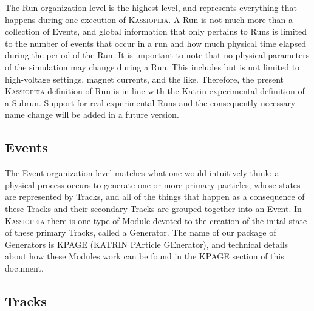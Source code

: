 The Run organization level is the highest level, and represents everything that happens during one execution of \textsc{Kassiopeia}.  A Run is not much more than a collection of Events, and global information that only pertains to Runs is limited to the number of events that occur in a run and how much physical time elapsed during the period of the Run.  It is important to note that no physical parameters of the simulation may change during a Run.  This includes but is not limited to high-voltage settings, magnet currents, and the like.  Therefore, the present \textsc{Kassiopeia} definition of Run is in line with the Katrin experimental definition of a Subrun.  Support for real experimental Runs and the consequently necessary name change will be added in a future version.

\subsection{Events}
\label{arch:events}

The Event organization level matches what one would intuitively think: a physical process occurs to generate one or more primary particles, whose states are represented by Tracks, and all of the things that happen as a consequence of these Tracks and their secondary Tracks are grouped together into an Event.  In \textsc{Kassiopeia} there is one type of Module devoted to the creation of the inital state of these primary Tracks, called a Generator.  The name of our package of Generators is KPAGE (KATRIN PArticle GEnerator), and technical details about how these Modules work can be found in the KPAGE section of this document.

\subsection{Tracks}
\label{arch:tracks}

